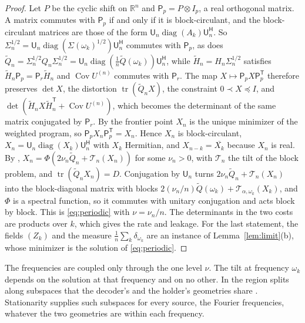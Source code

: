 \documentclass[11pt,onecolumn]{IEEEtran}
\newcommand{\R}{\mathbb{R}}
\newcommand{\tr}{\operatorname{tr}}
\newcommand{\Cov}{\operatorname{Cov}}
\newcommand{\tQ}{\tilde Q}
\newcommand{\tH}{\tilde H}
\newcommand{\herm}{\mathsf H}
\begin{document}
\begin{proof}
Let $P$ be the cyclic shift on $\R^n$ and $\mathsf P_p=P\otimes I_p$, a real
orthogonal matrix. A matrix commutes with $\mathsf P_p$ if and only if it
is block-circulant, and the block-circulant matrices are those of the
form $\mathsf U_n\operatorname{diag}(A_k)\mathsf U_n^{\herm}$. So
$\Sigma_n^{1/2}=\mathsf U_n\operatorname{diag}(\Sigma(\omega_k)^{1/2})\mathsf U_n^{\herm}$
commutes with $\mathsf P_p$, as does
$\tQ_n=\Sigma_n^{1/2}Q_n\Sigma_n^{1/2}=\mathsf U_n\operatorname{diag}(\tfrac1n\tQ(\omega_k))\mathsf U_n^{\herm}$,
while $\tH_n=H_n\Sigma_n^{1/2}$ satisfies $\tH_n\mathsf P_p=\mathsf P_r\tH_n$
and $\Cov U^{(n)}$ commutes with $\mathsf P_r$. The map
$X\mapsto\mathsf P_pX\mathsf P_p^{\mathsf T}$ therefore preserves
$\det X$, the distortion $\tr(\tQ_nX)$, the constraint
$0\prec X\preceq I$, and
$\det(\tH_nX\tH_n^{\mathsf T}+\Cov U^{(n)})$, which becomes the
determinant of the same matrix conjugated by $\mathsf P_r$. By
\cite[Theorem~5(a)]{part1} the frontier point $X_n$ is the unique
minimizer of the weighted program, so
$\mathsf P_pX_n\mathsf P_p^{\mathsf T}=X_n$. Hence $X_n$ is block-circulant,
$X_n=\mathsf U_n\operatorname{diag}(X_k)\mathsf U_n^{\herm}$ with $X_k$
Hermitian, and $X_{n-k}=\overline{X_k}$ because $X_n$ is real. By
\cite[Theorem~7]{part1},
$X_n=\Phi(2\nu_n\tQ_n+\mathcal T_n(X_n))$ for some $\nu_n>0$, with
$\mathcal T_n$ the tilt of the block problem, and
$\tr(\tQ_nX_n)=D$. Conjugation by $\mathsf U_n$ turns
$2\nu_n\tQ_n+\mathcal T_n(X_n)$ into the block-diagonal matrix with blocks
$2(\nu_n/n)\tQ(\omega_k)+\mathcal T_{\alpha,\omega_k}(X_k)$, and $\Phi$ is a
spectral function, so it commutes with unitary conjugation and acts
block by block. This is \eqref{eq:periodic} with $\nu=\nu_n/n$. The
determinants in the two costs are products over $k$, which gives the
rate and leakage. For the last statement, the fields $(Z_k)$ and the
measure $\tfrac1n\sum_k\delta_{\omega_k}$ are an instance of
Lemma~\ref{lem:limit}(b), whose minimizer is the solution of
\eqref{eq:periodic}.
\end{proof}

The frequencies are coupled only through the one level $\nu$. The tilt
at frequency $\omega_k$ depends on the solution at that frequency and on
no other. In \cite{part1} the region splits along subspaces that the
decoder's and the holder's geometries share
\cite[Theorem~12]{part1}. Stationarity supplies such subspaces for every
source, the Fourier frequencies, whatever the two geometries are within
each frequency.
\end{document}
